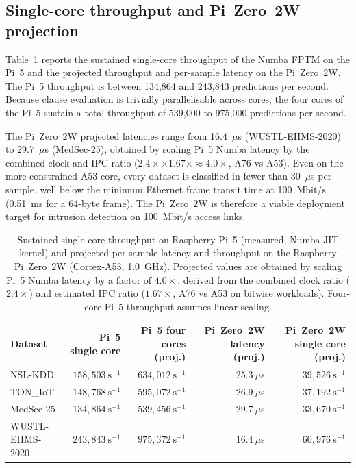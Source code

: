 \documentclass[journal,10pt]{IEEEtran}
\begin{document}
\subsection{Single-core throughput and Pi~Zero~2W projection}
\label{sec:res-throughput}

Table~\ref{tab:throughput} reports the sustained single-core
throughput of the Numba FPTM on the Pi~5 and the projected
throughput and per-sample latency on the Pi~Zero~2W. The Pi~5
throughput is between 134{,}864 and 243{,}843 predictions per
second. Because clause evaluation is trivially parallelisable across
cores, the four cores of the Pi~5 sustain a total throughput of
539{,}000 to 975{,}000 predictions per second.

The Pi~Zero~2W projected latencies range from 16.4~$\mu$s
(WUSTL-EHMS-2020) to 29.7~$\mu$s (MedSec-25), obtained by scaling
Pi~5 Numba latency by the combined clock and IPC ratio
($2.4\times \times 1.67\times \approx 4.0\times$, A76 vs A53).
Even on the more constrained A53 core, every dataset is classified
in fewer than 30~$\mu$s per sample, well below the minimum Ethernet
frame transit time at 100~Mbit/s (0.51~ms for a 64-byte frame).
The Pi~Zero~2W is therefore a viable deployment target for intrusion
detection on 100~Mbit/s access links.

\begin{table}[t]
\centering\small
\caption{Sustained single-core throughput on Raspberry Pi~5 (measured,
         Numba JIT kernel) and projected per-sample latency and throughput
         on the Raspberry Pi~Zero~2W (Cortex-A53, 1.0~GHz). Projected values
         are obtained by scaling Pi~5 Numba latency by a factor of
         $4.0\times$, derived from the combined clock ratio ($2.4\times$)
         and estimated IPC ratio ($1.67\times$, A76 vs A53 on bitwise
         workloads). Four-core Pi~5 throughput assumes linear scaling.}
\label{tab:throughput}
\begin{tabular}{lrrrr}
\toprule
\textbf{Dataset}
  & \textbf{Pi~5 single core}
  & \textbf{Pi~5 four cores (proj.)}
  & \textbf{Pi~Zero~2W latency (proj.)}
  & \textbf{Pi~Zero~2W single core (proj.)} \\
\midrule
NSL-KDD         & $158{,}503~\text{s}^{-1}$ & $634{,}012~\text{s}^{-1}$ & $25.3~\mu$s & $39{,}526~\text{s}^{-1}$ \\
TON\_IoT        & $148{,}768~\text{s}^{-1}$ & $595{,}072~\text{s}^{-1}$ & $26.9~\mu$s & $37{,}192~\text{s}^{-1}$ \\
MedSec-25       & $134{,}864~\text{s}^{-1}$ & $539{,}456~\text{s}^{-1}$ & $29.7~\mu$s & $33{,}670~\text{s}^{-1}$ \\
WUSTL-EHMS-2020 & $243{,}843~\text{s}^{-1}$ & $975{,}372~\text{s}^{-1}$ & $16.4~\mu$s & $60{,}976~\text{s}^{-1}$ \\
\bottomrule
\end{tabular}
\end{table}
\end{document}
